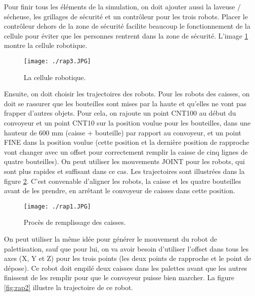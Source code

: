 Pour finir tous les éléments de la simulation, on doit ajouter aussi la laveuse / sécheuse, les grillages de sécurité et un contrôleur pour les trois robots. Placer le contrôleur dehors de la zone de sécurité facilite beaucoup le fonctionnement de la cellule pour éviter que les personnes rentrent dans la zone de sécurité. L’image \ref{fig:rap3} montre la cellule robotique.

\begin{figure}[H]
	\begin{center}	
		\texttt{[image: ./rap3.JPG]}
		\caption{La cellule robotique.}
		\label{fig:rap3}
	\end{center}
\end{figure}

Ensuite, on doit choisir les trajectoires des robots. Pour les robots des caisses, on doit se rassurer que les bouteilles sont mises par la haute et qu’elles ne vont pas frapper d’autres objets. Pour cela, on rajoute un point CNT100 au début du convoyeur et un point CNT10 sur la position voulue pour les bouteilles, dans une hauteur de 600 mm (caisse + bouteille) par rapport au convoyeur, et un point FINE dans la position voulue (cette position et la dernière position de rapproche vont changer avec un offset pour correctement remplir la caisse de cinq lignes de quatre bouteilles). On peut utiliser les mouvements JOINT pour les robots, qui sont plus rapides et suffisant dans ce cas. Les trajectoires sont illustrées dans la figure \ref{fig:rap1}. C’est convenable d’aligner les robots, la caisse et les quatre bouteilles avant de les prendre, en arrêtant le convoyeur de caisses dans cette position.

\begin{figure}[H]
	\begin{center}	
		\texttt{[image: ./rap1.JPG]}
		\caption{Procès de remplissage des caisses.}
		\label{fig:rap1}
	\end{center}
\end{figure}

On peut utiliser la même idée pour générer le mouvement du robot de palettisation, sauf que pour lui, on va avoir besoin d’utiliser l’offset dans tous les axes (X, Y et Z) pour les trois points (les deux points de rapproche et le point de dépose). Ce robot doit empilé deux caisses dans les palettes avant que les autres finissent de les remplir pour que le convoyeur puisse bien marcher. La figure \ref{fig:rap2} illustre la trajectoire de ce robot.

